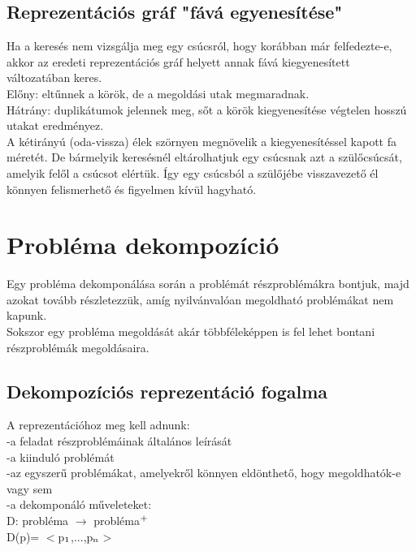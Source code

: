 \documentclass{article}
\begin{document}
	 \subsection{Reprezentációs gráf "fává egyenesítése"}
	 Ha a keresés nem vizsgálja meg egy csúcsról, hogy korábban már felfedezte-e, akkor az eredeti reprezentációs gráf helyett annak fává kiegyenesített változatában keres.\\
	 Előny: eltűnnek a körök, de a megoldási utak megmaradnak.\\
	 Hátrány: duplikátumok jelennek meg, sőt a körök kiegyenesítése végtelen hosszú utakat eredményez.\\
	 A kétirányú (oda-vissza) élek szörnyen megnövelik a kiegyenesítéssel kapott fa méretét. De bármelyik keresésnél eltárolhatjuk egy csúcsnak azt a szülőcsúcsát, amelyik felől a csúcsot elértük. Így egy csúcsból a szülőjébe visszavezető él könnyen felismerhető és figyelmen kívül hagyható.
	 
	 \section{Probléma dekompozíció}
	 Egy probléma dekomponálása során a problémát részproblémákra bontjuk, majd azokat tovább részletezzük, amíg nyilvánvalóan megoldható problémákat nem kapunk.\\
	 Sokszor egy probléma megoldását akár többféleképpen is fel lehet bontani részproblémák megoldásaira.
	 
	 \subsection{Dekompozíciós reprezentáció fogalma}
	 A reprezentációhoz meg kell adnunk:\\
	 -a feladat részproblémáinak általános leírását\\
	 -a kiinduló problémát\\
	 -az egyszerű problémákat, amelyekről könnyen eldönthető, hogy megoldhatók-e vagy sem\\
	 -a dekomponáló műveleteket:\\
	 \hspace*{1em}D: probléma $\rightarrow$ probléma$\textsuperscript{+}$\\
	 \hspace*{1em}D(p)= $<$p$\textsubscript{1}$,...,p$\textsubscript{n}$$>$
	 
\end{document}
